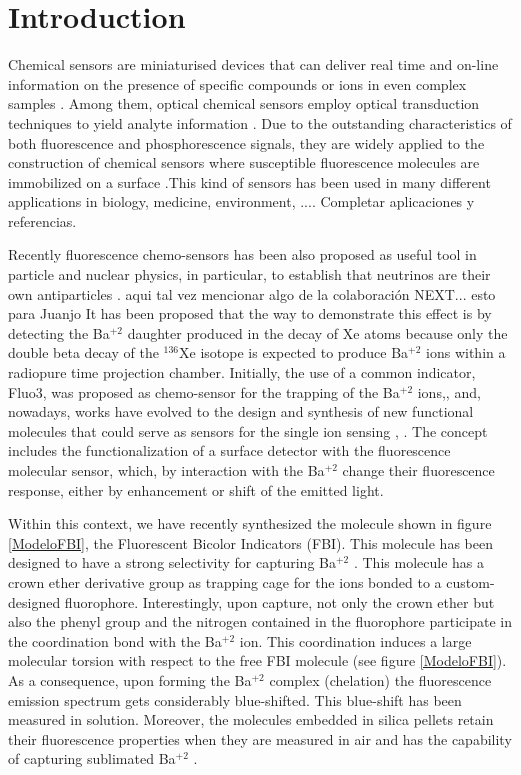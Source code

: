 \documentclass[aps,prl,reprint,longbibliography,superscriptaddress]{revtex4-1}
\def\Ba{Ba$^{+2}$ }
\newcommand{\completar}[1]{{\color{red} #1}}
\begin{document}
\section{Introduction } 
Chemical sensors are miniaturised devices that can deliver real time and on-line information on the presence of specific compounds or ions in even complex samples \cite{cammann1996cambridge}. 
 Among them, optical chemical sensors employ optical transduction techniques to yield analyte information \cite{mcdonagh_optical_2008}. Due to the outstanding characteristics of both fluorescence and phosphorescence signals, they are widely applied to the construction of chemical sensors where susceptible fluorescence molecules are immobilized on a surface \cite{wolfbeis_materials_2005}.This kind of sensors has been used in many different applications in biology, medicine, environment,  \completar{.... Completar aplicaciones y referencias}. 
 
 Recently fluorescence chemo-sensors has been also proposed as useful tool in particle and nuclear physics, in particular, to establish that neutrinos are their own antiparticles \cite{majorana_teoria_2008}. \completar{aqui tal vez mencionar algo de la colaboración NEXT... esto para Juanjo} It has been proposed that the way to demonstrate this effect is by detecting the \Ba daughter produced in the decay of Xe atoms \cite{Nygren_2015} because only the double beta decay of the $^{136}$Xe isotope is expected to produce \Ba ions within a radiopure time projection chamber.
 Initially, the use of a common indicator, Fluo3, was proposed as chemo-sensor for the trapping of the \Ba ions,\cite{jones_single_2016},\cite{next_collaboration_demonstration_2018} and, nowadays, works have evolved to the design and synthesis of new functional molecules that could serve as sensors for the single ion sensing \cite{thapa_barium_2019},  \cite{thapa_demonstration_2021}. The concept includes the functionalization of a surface detector with the fluorescence molecular sensor, which, by interaction with the \Ba change their fluorescence response, either by enhancement or shift of the emitted light.  
 
 Within this context, we have recently synthesized the molecule shown in figure \ref{ModeloFBI}, the Fluorescent Bicolor Indicators (FBI). This molecule has been designed to have a strong selectivity for capturing \Ba. \cite{rivilla_fluorescent_2020} This molecule has a crown ether derivative group as trapping cage for the ions bonded to a custom-designed fluorophore. Interestingly, upon capture, not only the crown ether but also the phenyl group and the nitrogen contained in the fluorophore participate in the coordination bond with the \Ba  ion. This coordination induces a large molecular torsion with respect to the free FBI molecule (see figure \ref{ModeloFBI}). As a consequence, upon forming the \Ba  complex (chelation) the fluorescence emission spectrum gets considerably blue-shifted. This blue-shift has been measured in solution\cite{rivilla_fluorescent_2020}. Moreover, the molecules embedded in silica pellets retain their fluorescence properties when they are measured in air and has the capability of capturing sublimated \Ba.
 
\end{document}
